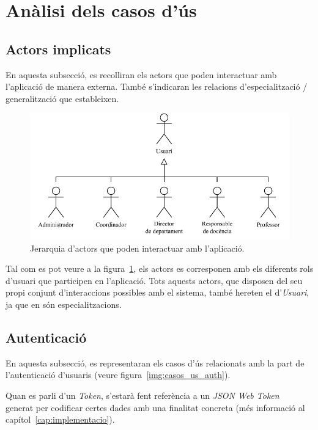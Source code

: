 \documentclass[a4paper,12pt]{ThesisStyle}
\begin{document}
\section{Anàlisi dels casos d'ús}
\label{sec:casos_us}

\subsection{Actors implicats}
\label{subsec:casos_us_actors}

En aquesta subsecció, es recolliran els actors que poden interactuar amb l'aplicació de manera externa. També s'indicaran les relacions d'especialització / generalització que estableixen.

\begin{figure}[H]
  \centering
  \includegraphics[width=\textwidth]{assets/use_cases/actors.pdf}
  \caption{\label{img:casos_us_actors}Jerarquia d'actors que poden interactuar amb l'aplicació.}
\end{figure}

Tal com es pot veure a la figura~\ref{img:casos_us_actors}, els actors es corresponen amb els diferents rols d'usuari que participen en l'aplicació. Tots aquests actors, que disposen del seu propi conjunt d'interaccions possibles amb el sistema, també hereten el d'\emph{Usuari}, ja que en són especialitzacions.

\subsection{Autenticació}
\label{subsec:casos_us_auth}

En aquesta subsecció, es representaran els casos d'ús relacionats amb la part de l'autenticació d'usuaris (veure figura~\ref{img:casos_us_auth}).

Quan es parli d'un \textit{Token}, s'estarà fent referència a un \textit{JSON Web Token}~\cite{JWT} generat per codificar certes dades amb una finalitat concreta (més informació al capítol~\ref{cap:implementacio}).
\end{document}
